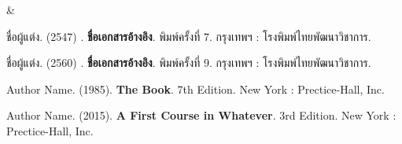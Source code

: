 \begin{weeklyplan}

\thewlec &  
\\ \hline

\end{weeklyplan}

\begin{bibliography}
\item ชื่อผู้แต่ง. (2547)	. \textbf{ชื่อเอกสารอ้างอิง}. พิมพ์ครั้งที่ 7.  กรุงเทพฯ : โรงพิมพ์ไทยพัฒนาวิชาการ.
\item ชื่อผู้แต่ง. (2560)	. \textbf{ชื่อเอกสารอ้างอิง}. พิมพ์ครั้งที่ 9.  กรุงเทพฯ : โรงพิมพ์ไทยพัฒนาวิชาการ.
\item Author Name. (1985). \textbf{The Book}. 7th Edition.  New York : Prectice-Hall, Inc.
\item Author Name. (2015). \textbf{A First Course in Whatever}. 3rd Edition.  New York : Prectice-Hall, Inc.
\end{bibliography}



